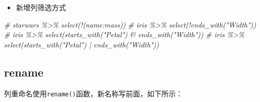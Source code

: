 \documentclass[
]{book}
\newenvironment{Shaded}{\begin{snugshade}}{\end{snugshade}}
\newcommand{\CommentTok}[1]{\textcolor[rgb]{0.56,0.35,0.01}{\textit{#1}}}
\providecommand{\tightlist}{%
  \setlength{\itemsep}{0pt}\setlength{\parskip}{0pt}}
\begin{document}
\begin{itemize}
\tightlist
\item
  新增列筛选方式
\end{itemize}

\begin{Shaded}
\begin{Highlighting}[]
\CommentTok{\# starwars \%\textgreater{}\% select(!(name:mass))}
\CommentTok{\# iris \%\textgreater{}\% select(!ends\_with("Width"))}
\CommentTok{\# iris \%\textgreater{}\% select(starts\_with("Petal") \& ends\_with("Width"))}
\CommentTok{\# iris \%\textgreater{}\% select(starts\_with("Petal") | ends\_with("Width"))}
\end{Highlighting}
\end{Shaded}

\hypertarget{dplyr-rename}{%
\subsection{rename}\label{dplyr-rename}}

列重命名使用\texttt{rename()}函数，新名称写前面，如下所示：
\end{document}
